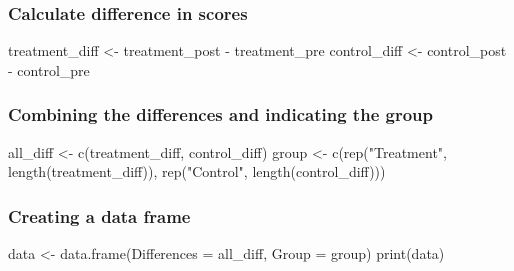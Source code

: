 \documentclass[
]{article}
\newenvironment{Shaded}{\begin{snugshade}}{\end{snugshade}}
\newcommand{\AttributeTok}[1]{\textcolor[rgb]{0.77,0.63,0.00}{#1}}
\newcommand{\FunctionTok}[1]{\textcolor[rgb]{0.00,0.00,0.00}{#1}}
\newcommand{\NormalTok}[1]{#1}
\newcommand{\OtherTok}[1]{\textcolor[rgb]{0.56,0.35,0.01}{#1}}
\newcommand{\SpecialCharTok}[1]{\textcolor[rgb]{0.00,0.00,0.00}{#1}}
\newcommand{\StringTok}[1]{\textcolor[rgb]{0.31,0.60,0.02}{#1}}
\begin{document}
\hypertarget{calculate-difference-in-scores}{%
\subsubsection{Calculate difference in
scores}\label{calculate-difference-in-scores}}

\begin{Shaded}
\begin{Highlighting}[]
\NormalTok{treatment\_diff }\OtherTok{\textless{}{-}}\NormalTok{ treatment\_post }\SpecialCharTok{{-}}\NormalTok{ treatment\_pre}
\NormalTok{control\_diff }\OtherTok{\textless{}{-}}\NormalTok{ control\_post }\SpecialCharTok{{-}}\NormalTok{ control\_pre}
\end{Highlighting}
\end{Shaded}

\hypertarget{combining-the-differences-and-indicating-the-group}{%
\subsubsection{Combining the differences and indicating the
group}\label{combining-the-differences-and-indicating-the-group}}

\begin{Shaded}
\begin{Highlighting}[]
\NormalTok{all\_diff }\OtherTok{\textless{}{-}} \FunctionTok{c}\NormalTok{(treatment\_diff, control\_diff)}
\NormalTok{group }\OtherTok{\textless{}{-}} \FunctionTok{c}\NormalTok{(}\FunctionTok{rep}\NormalTok{(}\StringTok{"Treatment"}\NormalTok{, }\FunctionTok{length}\NormalTok{(treatment\_diff)), }\FunctionTok{rep}\NormalTok{(}\StringTok{"Control"}\NormalTok{, }\FunctionTok{length}\NormalTok{(control\_diff)))}
\end{Highlighting}
\end{Shaded}

\hypertarget{creating-a-data-frame}{%
\subsubsection{Creating a data frame}\label{creating-a-data-frame}}

\begin{Shaded}
\begin{Highlighting}[]
\NormalTok{data }\OtherTok{\textless{}{-}} \FunctionTok{data.frame}\NormalTok{(}\AttributeTok{Differences =}\NormalTok{ all\_diff, }\AttributeTok{Group =}\NormalTok{ group)}
\FunctionTok{print}\NormalTok{(data)}
\end{Highlighting}
\end{Shaded}
\end{document}
